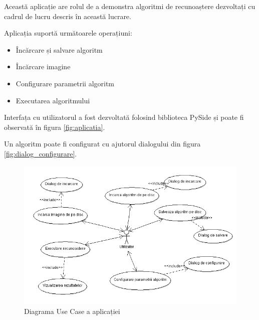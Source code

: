 
Această aplicație are rolul de a demonstra algoritmi de recunoaștere dezvoltați cu cadrul de lucru descris în această lucrare.

Aplicația suportă următoarele operațiuni:
\begin{itemize}
	\item Încărcare și salvare algoritm
	\item Încărcare imagine
	\item Configurare parametrii algoritm
	\item Executarea algoritmului
\end{itemize}

Interfața cu utilizatorul a fost dezvoltată folosind biblioteca PySide și poate fi observată în figura \ref{fig:aplicatia}.

Un algoritm poate fi configurat cu ajutorul dialogului din figura \ref{fig:dialog_configurare}.

\begin{figure}[H]
	\centering
		\includegraphics[width=1.00\textwidth]{uml/aplicatie_use_case.png}
	\caption{Diagrama Use Case a aplicației}
	\label{fig:aplicatie_use_case}
\end{figure}

